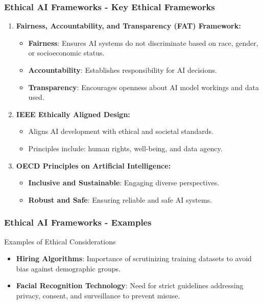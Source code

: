 \documentclass[aspectratio=169]{beamer}
\begin{document}
\begin{frame}[fragile]
    \frametitle{Ethical AI Frameworks - Key Ethical Frameworks}
    \begin{enumerate}
        \item \textbf{Fairness, Accountability, and Transparency (FAT) Framework:}
        \begin{itemize}
            \item \textbf{Fairness}: Ensures AI systems do not discriminate based on race, gender, or socioeconomic status.
            \item \textbf{Accountability}: Establishes responsibility for AI decisions.
            \item \textbf{Transparency}: Encourages openness about AI model workings and data used.
        \end{itemize}

        \item \textbf{IEEE Ethically Aligned Design:}
        \begin{itemize}
            \item Aligns AI development with ethical and societal standards.
            \item Principles include: human rights, well-being, and data agency.
        \end{itemize}

        \item \textbf{OECD Principles on Artificial Intelligence:}
        \begin{itemize}
            \item \textbf{Inclusive and Sustainable}: Engaging diverse perspectives.
            \item \textbf{Robust and Safe}: Ensuring reliable and safe AI systems.
        \end{itemize}
    \end{enumerate}
\end{frame}

\begin{frame}[fragile]
    \frametitle{Ethical AI Frameworks - Examples}
    \begin{block}{Examples of Ethical Considerations}
        \begin{itemize}
            \item \textbf{Hiring Algorithms}: Importance of scrutinizing training datasets to avoid bias against demographic groups.
            \item \textbf{Facial Recognition Technology}: Need for strict guidelines addressing privacy, consent, and surveillance to prevent misuse.
        \end{itemize}
    \end{block}
\end{frame}
\end{document}
